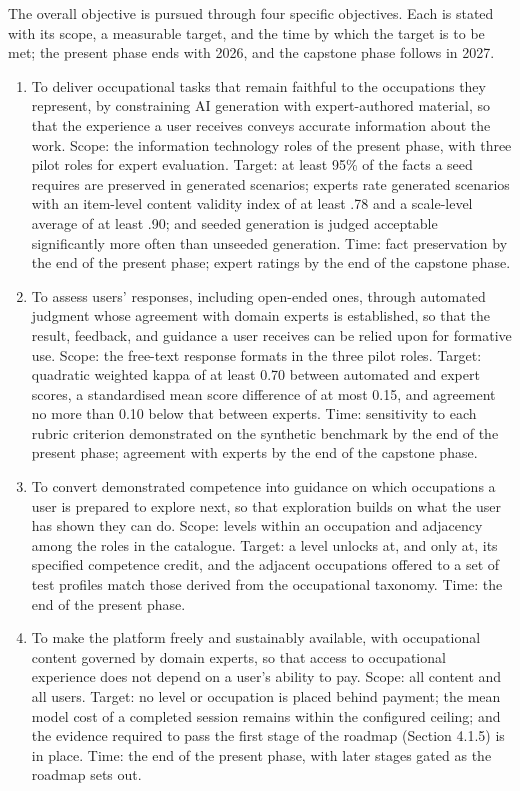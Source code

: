 The overall objective is pursued through four specific objectives. Each is stated with its scope, a measurable target, and the time by which the target is to be met; the present phase ends with 2026, and the capstone phase follows in 2027.

\begin{enumerate}[leftmargin=1.5em]
  \item To deliver occupational tasks that remain faithful to the occupations they represent, by constraining AI generation with expert-authored material, so that the experience a user receives conveys accurate information about the work. Scope: the information technology roles of the present phase, with three pilot roles for expert evaluation. Target: at least 95\% of the facts a seed requires are preserved in generated scenarios; experts rate generated scenarios with an item-level content validity index of at least .78 and a scale-level average of at least .90; and seeded generation is judged acceptable significantly more often than unseeded generation. Time: fact preservation by the end of the present phase; expert ratings by the end of the capstone phase.
  \item To assess users' responses, including open-ended ones, through automated judgment whose agreement with domain experts is established, so that the result, feedback, and guidance a user receives can be relied upon for formative use. Scope: the free-text response formats in the three pilot roles. Target: quadratic weighted kappa of at least 0.70 between automated and expert scores, a standardised mean score difference of at most 0.15, and agreement no more than 0.10 below that between experts. Time: sensitivity to each rubric criterion demonstrated on the synthetic benchmark by the end of the present phase; agreement with experts by the end of the capstone phase.
  \item To convert demonstrated competence into guidance on which occupations a user is prepared to explore next, so that exploration builds on what the user has shown they can do. Scope: levels within an occupation and adjacency among the roles in the catalogue. Target: a level unlocks at, and only at, its specified competence credit, and the adjacent occupations offered to a set of test profiles match those derived from the occupational taxonomy. Time: the end of the present phase.
  \item To make the platform freely and sustainably available, with occupational content governed by domain experts, so that access to occupational experience does not depend on a user's ability to pay. Scope: all content and all users. Target: no level or occupation is placed behind payment; the mean model cost of a completed session remains within the configured ceiling; and the evidence required to pass the first stage of the roadmap (Section 4.1.5) is in place. Time: the end of the present phase, with later stages gated as the roadmap sets out.
\end{enumerate}

